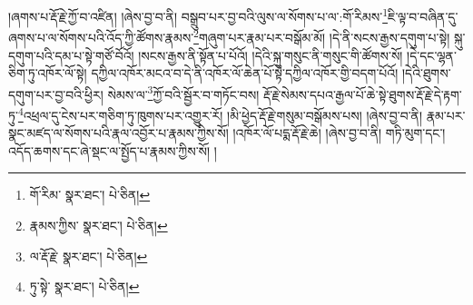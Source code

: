 །ཞགས་པ་རྡོ་རྗེ་ཀྱོ་བ་འཛིན། །ཞེས་བྱ་བ་ནི། བསྒྲུབ་པར་བྱ་བའི་ལུས་ལ་སོགས་པ་ལ་:གོ་རིམས་\footnote{གོ་རིམ་  སྣར་ཐང་།  པེ་ཅིན། }ཇི་ལྟ་བ་བཞིན་དུ་ཞགས་པ་ལ་སོགས་པའི་འོད་ཀྱི་ཚོགས་རྣམས་\footnote{རྣམས་ཀྱིས་  སྣར་ཐང་།  པེ་ཅིན། }གཞུག་པར་རྣམ་པར་བསྒོམ་མོ། །དེ་ནི་སངས་རྒྱས་དགུག་པ་སྟེ། སྐུ་དགུག་པའི་དམ་པ་སྟེ་གཙོ་བོའོ། །སངས་རྒྱས་ནི་སྟོན་པ་པོའོ། །དེའི་སྐུ་གསུང་ནི་གསུང་གི་ཚོགས་སོ། །དེ་དང་ལྷན་ཅིག་ཏུ་འཁོར་ལོ་སྟེ། དཀྱིལ་འཁོར་མངའ་བ་དེ་ནི་འཁོར་ལོ་ཆེན་པོ་སྟེ་དཀྱིལ་འཁོར་གྱི་བདག་པོའོ། །དེའི་ཐུགས་དགུག་པར་བྱ་བའི་ཕྱིར། སེམས་ལ་\footnote{ལ་རྡོ་རྗེ་  སྣར་ཐང་།  པེ་ཅིན། }ཀྱོ་བའི་སྦྱོར་བ་གཏོང་བས། རྡོ་རྗེ་སེམས་དཔའ་རྒྱལ་པོ་ཆེ་སྟེ་ཐུགས་རྡོ་རྗེ་དེ་རྟག་ཏུ་\footnote{ཏུ་སྟེ་  སྣར་ཐང་།  པེ་ཅིན། }འཕྲལ་དུ་ངེས་པར་གཅིག་ཏུ་ཁུགས་པར་འགྱུར་རོ། །མི་ཕྱེད་རྡོ་རྗེ་གསུམ་བསྒོམས་པས། །ཞེས་བྱ་བ་ནི། རྣམ་པར་སྣང་མཛད་ལ་སོགས་པའི་རྣལ་འབྱོར་པ་རྣམས་ཀྱིས་སོ། །འཁོར་ལོ་པདྨ་རྡོ་རྗེ་ཆེ། །ཞེས་བྱ་བ་ནི། གཏི་མུག་དང་། འདོད་ཆགས་དང་ཞེ་སྡང་ལ་སྤྱོད་པ་རྣམས་ཀྱིས་སོ། །
